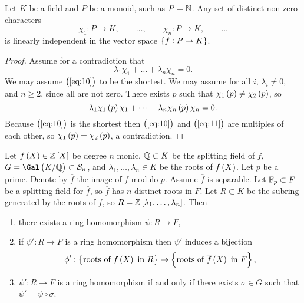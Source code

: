 \begin{theorem}
Let $ K $ be a field and $ P $ be a monoid, such as $ P = \mathbb{N} $. Any set of distinct non-zero characters
$$ \chi_1 : P \to K, \qquad \dots, \qquad \chi_n : P \to K, \qquad \dots $$
is linearly independent in the vector space $ \cbr{f : P \to K} $.
\end{theorem}

\begin{proof}
Assume for a contradiction that
\begin{equation}
\label{eq:10}
\lambda_1\chi_1 + \dots + \lambda_n\chi_n = 0.
\end{equation}
We may assume $ \br{\ref{eq:10}} $ to be the shortest. We may assume for all $ i $, $ \lambda_i \ne 0 $, and $ n \ge 2 $, since all are not zero. There exists $ p $ such that $ \chi_1\br{p} \ne \chi_2\br{p} $, so
\begin{equation}
\label{eq:11}
\lambda_1\chi_1\br{p}\chi_1 + \dots + \lambda_n\chi_n\br{p}\chi_n = 0.
\end{equation}
Because $ \br{\ref{eq:10}} $ is the shortest then $ \br{\ref{eq:10}} $ and $ \br{\ref{eq:11}} $ are multiples of each other, so $ \chi_1\br{p} = \chi_2\br{p} $, a contradiction.
\end{proof}

\pagebreak

\begin{theorem}
\label{thm:ringhomomorphism}
Let $ f\br{X} \in \ZZ\sbr{X} $ be degree $ n $ monic, $ \mathbb{Q} \subset K $ be the splitting field of $ f $, $ G = \Gal\br{K / \QQ} \subset \SSS_n $, and $ \lambda_1, \dots, \lambda_n \in K $ be the roots of $ f\br{X} $. Let $ p $ be a prime. Denote by $ \overline{f} $ the image of $ f $ modulo $ p $. Assume $ \overline{f} $ is separable. Let $ \mathbb{F}_p \subset F $ be a splitting field for $ \overline{f} $, so $ \overline{f} $ has $ n $ distinct roots in $ F $. Let $ R \subset K $ be the subring generated by the roots of $ f $, so $ R = \ZZ\sbr{\lambda_1, \dots, \lambda_n} $. Then
\begin{enumerate}
\item there exists a ring homomorphism $ \psi : R \to F $,
\item if $ \psi' : R \to F $ is a ring homomorphism then $ \psi' $ induces a bijection
$$ \phi' : \cbr{\text{roots of} \ f\br{X} \ \text{in} \ R} \to \cbr{\text{roots of} \ \overline{f}\br{X} \ \text{in} \ F}, $$
\item $ \psi' : R \to F $ is a ring homomorphism if and only if there exists $ \sigma \in G $ such that $ \psi' = \psi \circ \sigma $.
\end{enumerate}
\end{theorem}

